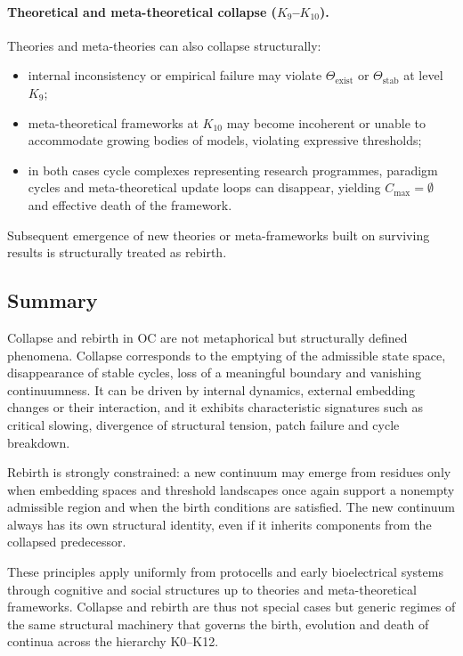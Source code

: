 \paragraph{Theoretical and meta-theoretical collapse (\texorpdfstring{\(K_9\)}{K_9}–\(K_{10}\)).}
Theories and meta-theories can also collapse structurally:
\begin{itemize}
  \item internal inconsistency or empirical failure may violate
        \(\Theta_{\mathrm{exist}}\) or \(\Theta_{\mathrm{stab}}\) at level
        \(K_9\);
  \item meta-theoretical frameworks at \(K_{10}\) may become incoherent or
        unable to accommodate growing bodies of models, violating expressive
        thresholds;
  \item in both cases cycle complexes representing research programmes,
        paradigm cycles and meta-theoretical update loops can disappear,
        yielding \(C_{\max}=\emptyset\) and effective death of the framework.
\end{itemize}
Subsequent emergence of new theories or meta-frameworks built on surviving
results is structurally treated as rebirth.

\subsection{Summary}

Collapse and rebirth in OC are not metaphorical but structurally defined
phenomena. Collapse corresponds to the emptying of the admissible state
space, disappearance of stable cycles, loss of a meaningful boundary and
vanishing continuumness. It can be driven by internal dynamics, external
embedding changes or their interaction, and it exhibits characteristic
signatures such as critical slowing, divergence of structural tension, patch
failure and cycle breakdown.

Rebirth is strongly constrained: a new continuum may emerge from residues only
when embedding spaces and threshold landscapes once again support a nonempty
admissible region and when the birth conditions are satisfied. The new
continuum always has its own structural identity, even if it inherits
components from the collapsed predecessor.

These principles apply uniformly from protocells and early bioelectrical
systems through cognitive and social structures up to theories and
meta-theoretical frameworks. Collapse and rebirth are thus not special
cases but generic regimes of the same structural machinery that governs the
birth, evolution and death of continua across the hierarchy K0--K12.
